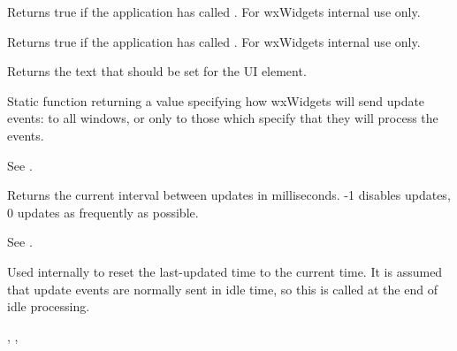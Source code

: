 Returns true if the application has called . For wxWidgets internal use only.

\label{wxupdateuieventgetsettext}


Returns true if the application has called . For wxWidgets internal use only.

\label{wxupdateuieventgettext}


Returns the text that should be set for the UI element.

\label{wxupdateuieventgetmode}


Static function returning a value specifying how wxWidgets
will send update events: to all windows, or only to those which specify that they
will process the events.

See .

\label{wxupdateuieventgetupdateinterval}


Returns the current interval between updates in milliseconds.
-1 disables updates, 0 updates as frequently as possible.

See .

\label{wxupdateuieventresetupdatetime}


Used internally to reset the last-updated time to the
current time. It is assumed that update events are
normally sent in idle time, so this is called at the end of
idle processing.


, 
, 

\label{wxupdateuieventsetmode}

